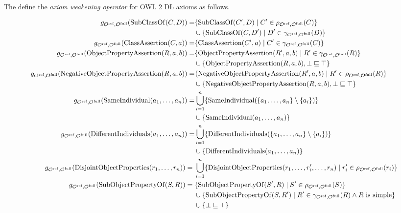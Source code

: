 \begin{definition}
  The define the \emph{axiom weakening operator} for OWL 2 DL axioms as follows.
  \begin{widepage}
    \scriptsize
    \begin{align*}
      g_{\Omcref,\Omcfull}(\op{SubClassOf}(C, D)) = & \{\op{SubClassOf}(C', D) \mid C' \in \rho_{\Omcref,\Omcfull} (C)\} \\& \cup \{\op{SubClassOf}(C, D') \mid D' \in \gamma_{\Omcref,\Omcfull} (D)\} \\
      g_{\Omcref,\Omcfull}(\op{ClassAssertion}(C, a)) = & \{\op{ClassAssertion}(C', a) \mid C' \in \gamma_{\Omcref,\Omcfull} (C)\} \\
      g_{\Omcref,\Omcfull}(\op{ObjectPropertyAssertion}(R, a, b)) = & \{\op{ObjectPropertyAssertion}(R', a, b) \mid R' \in \gamma_{\Omcref,\Omcfull} (R)\} \\& \cup \{ \op{ObjectPropertyAssertion}(R, a, b), \bot \sqsubseteq \top \} \\
      g_{\Omcref,\Omcfull}(\op{NegativeObjectPropertyAssertion}(R, a, b)) = & \{\op{NegativeObjectPropertyAssertion}(R', a, b) \mid R' \in \rho_{\Omcref,\Omcfull} (R)\} \\& \cup \{\op{NegativeObjectPropertyAssertion}(R, a, b), \bot \sqsubseteq \top \} \\
      g_{\Omcref,\Omcfull}(\op{SameIndividual}(a_1, \dots, a_n)) = & \bigcup_{i=1}^n \{ \op{SameIndividual}(\{a_1, \dots, a_n\} \setminus \{a_i\}) \} \\& \cup \{ \op{SameIndividual}(a_1, \dots, a_n)\} \\
      g_{\Omcref,\Omcfull}(\op{DifferentIndividuals}(a_1, \dots, a_n)) = & \bigcup_{i=1}^n \{ \op{DifferentIndividuals}(\{a_1, \dots, a_n\} \setminus \{a_i\}) \} \\& \cup \{ \op{DifferentIndividuals}(a_1, \dots, a_n)\} \\
      g_{\Omcref,\Omcfull}(\op{DisjointObjectProperties}(r_1, \dots, r_n)) ={} & \bigcup_{i=1}^n \{ \op{DisjointObjectProperties}(r_1, \dots, r_i', \dots, r_n) \mid r_i' \in \rho_{\Omcref,\Omcfull}(r_i) \} \\
      g_{\Omcref,\Omcfull}(\op{SubObjectPropertyOf}(S, R)) ={} & \{\op{SubObjectPropertyOf}(S', R) \mid S' \in \rho_{\Omcref,\Omcfull} (S)\} \\& \cup \{\op{SubObjectPropertyOf}(S, R') \mid R' \in \gamma_{\Omcref,\Omcfull} (R) \land R \text{ is simple}\} \\& \cup \{ \bot \sqsubseteq \top \} \\

\end{align*}
\end{widepage}
\end{definition}
